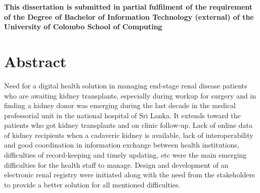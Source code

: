 \documentclass[12pt,a4paper]{report}
\begin{document}
\begin{titlepage}
{\fontsize{12pt}{12}\selectfont \textbf {This dissertation is submitted in partial fulfilment of the requirement of the Degree of Bachelor of Information Technology (external) of the University of Colombo School of Computing}\\[0.5cm]
}

\vspace*{\fill}

\end{titlepage}




%
%
%
%
%
%
%

\section*{Abstract}

Need for a digital health solution in managing end-stage renal disease patients who are awaiting kidney transplants, especially during workup for surgery and in finding a kidney donor was emerging during the last decade in the medical professorial unit in the national hospital of Sri Lanka. It extends toward the patients who got kidney transplants and on clinic follow-up. Lack of online data of kidney recipients when a cadaveric kidney is available, lack of interoperability and good coordination in information exchange between health institutions, difficulties of record-keeping and timely updating, etc were the main emerging difficulties for the health staff to manage. Design and development of an electronic renal registry were initiated along with the need from the stakeholders to provide a better solution for all mentioned difficulties.
\end{document}
